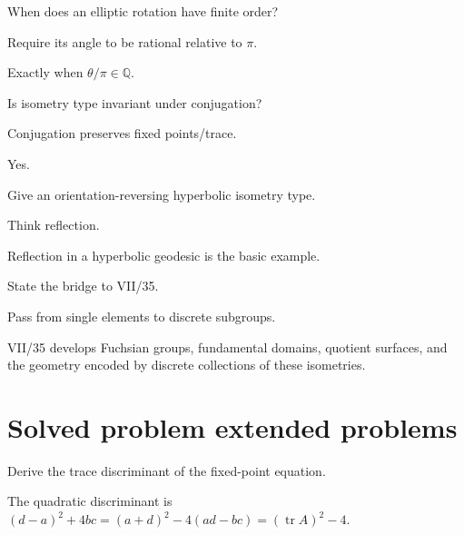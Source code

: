 \begin{exercise}\label{exr:vii34-21}
When does an elliptic rotation have finite order?
\end{exercise}
\begin{hint}
Require its angle to be rational relative to \(\pi\).
\end{hint}
\begin{solution}
Exactly when \(\theta/\pi\in\mathbb Q\).
\end{solution}

\begin{exercise}\label{exr:vii34-22}
Is isometry type invariant under conjugation?
\end{exercise}
\begin{hint}
Conjugation preserves fixed points/trace.
\end{hint}
\begin{solution}
Yes.
\end{solution}

\begin{exercise}\label{exr:vii34-23}
Give an orientation-reversing hyperbolic isometry type.
\end{exercise}
\begin{hint}
Think reflection.
\end{hint}
\begin{solution}
Reflection in a hyperbolic geodesic is the basic example.
\end{solution}

\begin{exercise}\label{exr:vii34-24}
State the bridge to VII/35.
\end{exercise}
\begin{hint}
Pass from single elements to discrete subgroups.
\end{hint}
\begin{solution}
VII/35 develops Fuchsian groups, fundamental domains, quotient surfaces, and the geometry encoded by discrete collections of these isometries.
\end{solution}

\section{Solved problem extended problems}
\begin{problem}\label{prob:vii34-01}
Derive the trace discriminant of the fixed-point equation.
\end{problem}
\begin{solution}
The quadratic discriminant is \((d-a)^2+4bc=(a+d)^2-4(ad-bc)=(\operatorname{tr}A)^2-4\).
\end{solution}

